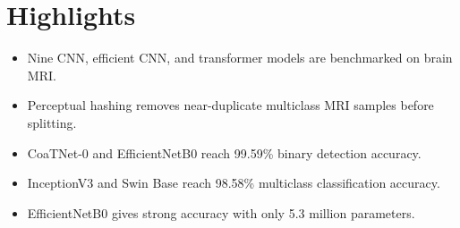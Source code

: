 \documentclass[12pt]{article}
\begin{document}
\section*{Highlights}

\begin{itemize}
\item Nine CNN, efficient CNN, and transformer models are benchmarked on brain MRI.
\item Perceptual hashing removes near-duplicate multiclass MRI samples before splitting.
\item CoaTNet-0 and EfficientNetB0 reach 99.59\% binary detection accuracy.
\item InceptionV3 and Swin Base reach 98.58\% multiclass classification accuracy.
\item EfficientNetB0 gives strong accuracy with only 5.3 million parameters.
\end{itemize}
\end{document}
